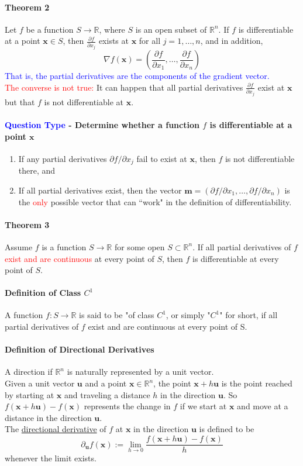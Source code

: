 \documentclass[11pt]{article}
\newcommand{\tb}[1]{\textbf{#1}}
\newcommand{\real}[0]{\mathbb{R}}
\newcommand{\under}[1]{\underline{#1}}
\newcommand{\vx}[0]{\tb{x}}
\newcommand{\vm}[0]{\tb{m}}
\newcommand{\vu}[0]{\tb{u}}
\newcommand{\p}[0]{\partial}
\begin{document}
\paragraph{Theorem 2} Let $f$ be a function $S \rightarrow \real$, where $S$ is an open subset of $\real^n$. If $f$ is differentiable at a point $\vx \in S$, then $\frac{\p f}{\p x_j}$ exists at $\vx$ for all $j = 1, \hdots, n$, and in addition, $$\nabla f(\vx) = (\frac{\p f}{\p x_1}, \hdots, \frac{\p f}{\p x_n})$$
\textcolor{blue}{That is, the partial derivatives are the components of the gradient vector.}\\
\textcolor{red}{The converse is not true:} It can happen that all partial derivatives $\frac{\p f}{\p x_j}$ exist at $\vx$ but that $f$ is not differentiable at $\vx$.

\paragraph{\textcolor{blue}{Question Type} - Determine whether a function $f$ is differentiable at a point $\vx$}
\begin{enumerate}
	\item If any partial derivatives $\p f/\p x_j$ fail to exist at $\vx$, then $f$ is not differentiable there, and
	\item If all partial derivatives exist, then the vector $\vm = (\p f/\p x_1, \hdots, \p f/ \p x_n)$ is the \textcolor{red}{only} possible vector that can ``work" in the definition of differentiability.
\end{enumerate}
\paragraph{Theorem 3} Assume $f$ is a function $S \rightarrow \real$ for some open $S \subset \real^n$. If all partial derivatives of $f$ \textcolor{red}{exist and are continuous} at every point of $S	$, then $f$ is differentiable at every point of $S$.
\paragraph{Definition of Class $C^1$} A function $f : S \rightarrow \real$ is said to be "of class $C^1$, or simply "$C^1$" for short, if all partial derivatives of $f$ exist and are continuous at every point of S.

\paragraph{Definition of Directional Derivatives}
A direction if $\real^n$ is naturally represented by a unit vector.\\
Given a unit vector $\vu$ and a point $\vx \in \real^n$, the point $\vx + h\vu$ is the point reached by starting at $\vx$ and traveling a distance $h$ in the direction $\vu$. So $f(\vx + h\vu) - f(\vx)$ represents the change in $f$ if we start at $\vx$ and move at a distance in the direction $\vu$.\\
The \under{directional derivative} of $f$ at $\vx$ in the direction $\vu$ is defined to be 
$$\p_\vu f(\vx) := \underset{h \rightarrow 0}{\lim} \frac{f(\vx+h \vu) - f(\vx)}{h}$$
whenever the limit exists.
\end{document}
